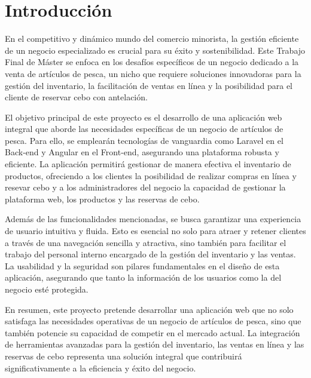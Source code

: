 
\chapter{Introducción}\label{cap:cap1}

En el competitivo y dinámico mundo del comercio minorista, la gestión eficiente de un negocio especializado es crucial para su éxito y sostenibilidad. Este Trabajo Final de Máster se enfoca en los desafíos específicos de un negocio dedicado a la venta de artículos de pesca, un nicho que requiere soluciones innovadoras para la gestión del inventario, la facilitación de ventas en línea y la posibilidad para el cliente de reservar cebo con antelación. 

\vspace{0.5cm}

El objetivo principal de este proyecto es el desarrollo de una aplicación web integral que aborde las necesidades específicas de un negocio de artículos de pesca. Para ello, se emplearán tecnologías de vanguardia como Laravel en el Back-end y Angular en el Front-end, asegurando una plataforma robusta y eficiente. La aplicación permitirá gestionar de manera efectiva el inventario de productos, ofreciendo a los clientes la posibilidad de realizar compras en línea y resevar cebo y a los administradores del negocio la capacidad de gestionar la plataforma web, los productos y las reservas de cebo.

\vspace{0.5cm}

Además de las funcionalidades mencionadas, se busca garantizar una experiencia de usuario intuitiva y fluida. Esto es esencial no solo para atraer y retener clientes a través de una navegación sencilla y atractiva, sino también para facilitar el trabajo del personal interno encargado de la gestión del inventario y las ventas. La usabilidad y la seguridad son pilares fundamentales en el diseño de esta aplicación, asegurando que tanto la información de los usuarios como la del negocio esté protegida.

\vspace{0.5cm}

En resumen, este proyecto pretende desarrollar una aplicación web que no solo satisfaga las necesidades operativas de un negocio de artículos de pesca, sino que también potencie su capacidad de competir en el mercado actual. La integración de herramientas avanzadas para la gestión del inventario, las ventas en línea y las reservas de cebo representa una solución integral que contribuirá significativamente a la eficiencia y éxito del negocio.


